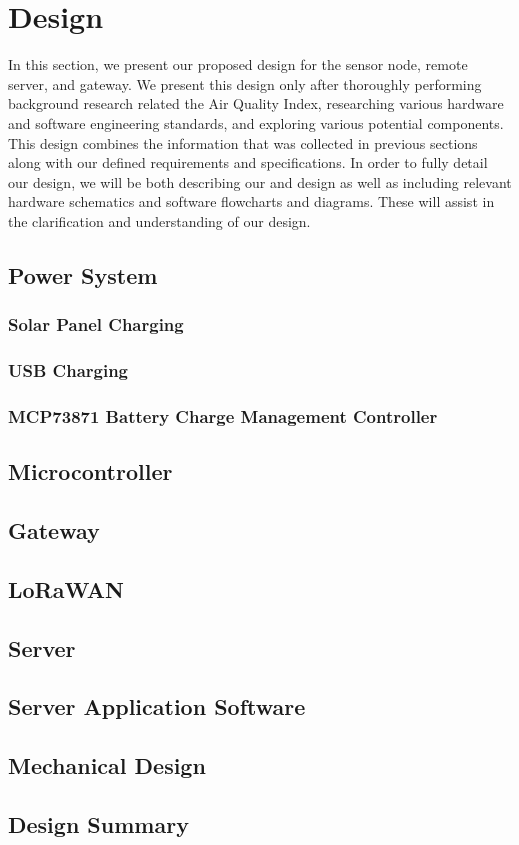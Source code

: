 \section{Design}
In this section, we present our proposed design for the sensor node, remote server, and gateway. We present this design only after thoroughly performing background research related the Air Quality Index, researching various hardware and software engineering standards, and exploring various potential components. This design combines the information that was collected in previous sections along with our defined requirements and specifications. In order to fully detail our design, we will be both describing our and design as well as including relevant hardware schematics and software flowcharts and diagrams. These will assist in the clarification and understanding of our design.

\subsection{Power System}
\subsubsection{Solar Panel Charging}
\subsubsection{USB Charging}
\subsubsection{MCP73871 Battery Charge Management Controller}
\subsection{Microcontroller}
\subsection{Gateway}
\subsection{LoRaWAN}
\subsection{Server}



\subsection{Server Application Software}
\subsection{Mechanical Design}
\subsection{Design Summary}

